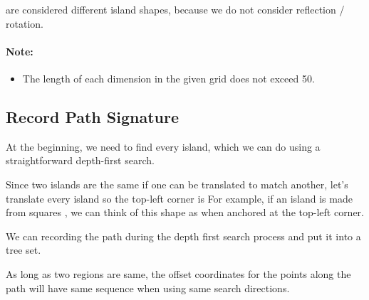 are considered different island shapes, because we do not consider reflection / rotation.

\paragraph{Note:} 

\begin{itemize}
\item The length of each dimension in the given grid does not exceed 50.
\end{itemize}

\subsection{Record Path Signature}

At the beginning, we need to find every island, which we can do using a straightforward depth-first search. 

Since two islands are the same if one can be translated to match another, let's translate every island so the top-left corner is  For example, if an island is made from squares \fcc{[(2, 3), (2, 4), (3, 4)]}, we can think of this shape as \fcc{[(0, 0), (0, 1), (1, 1)]} when anchored at the top-left corner.

We can recording the path during the depth first search process and put it into a tree set.

As long as two regions are same, the offset coordinates for the points along the path will have same sequence when using same search directions. 

